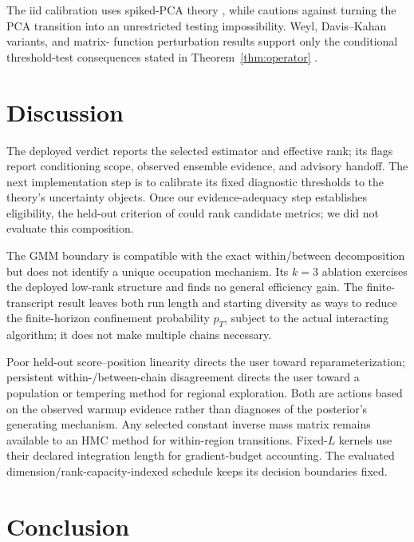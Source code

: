 \documentclass[11pt]{article}
\theoremstyle{plain}
\theoremstyle{definition}
\theoremstyle{remark}
\begin{document}
The iid calibration uses spiked-PCA theory
\citep{baik2005phase,baik2006eigenvalues,paul2007asymptotics}, while
\citet{onatski2013asymptotic} cautions against turning the PCA transition into
an unrestricted testing impossibility. Weyl, Davis--Kahan variants, and matrix-
function perturbation results support only the conditional threshold-test
consequences stated in Theorem~\ref{thm:operator}
\citep{bhatia1997matrix,yu2015useful,higham2008functions}.

\section{Discussion}\label{sec:discussion}

The deployed verdict reports the selected estimator and effective rank; its
flags report conditioning scope, observed ensemble evidence, and advisory
handoff. The next implementation step is to calibrate its fixed diagnostic
thresholds to the theory's uncertainty objects.
Once our evidence-adequacy step establishes eligibility, the held-out criterion
of \citet{bales2019selecting} could rank candidate metrics; we did not evaluate
this composition.

The GMM boundary is compatible with the exact within/between decomposition but
does not identify a unique occupation mechanism. Its $k=3$ ablation exercises
the deployed low-rank structure and finds no general efficiency gain. The
finite-transcript result leaves both run length and starting diversity as ways
to reduce the finite-horizon confinement probability $p_T$, subject to the
actual interacting algorithm; it does not make multiple chains necessary.

Poor held-out score--position linearity directs the user toward
reparameterization; persistent within-/between-chain disagreement directs the
user toward a population or tempering method for regional exploration. Both
are actions based on the observed warmup evidence rather than diagnoses of the
posterior's generating mechanism. Any selected constant inverse mass matrix
remains available to an HMC method for within-region transitions. Fixed-$L$
kernels use their declared integration length for gradient-budget accounting.
The evaluated dimension/rank-capacity-indexed schedule keeps its decision
boundaries fixed.

\section{Conclusion}\label{sec:conclusion}
\end{document}
